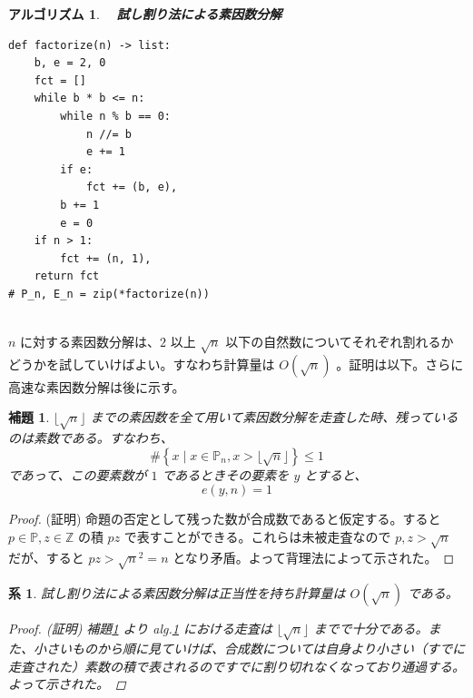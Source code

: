 \documentclass[12pt, a4j]{ltjsarticle}
\newtheorem{lem}[thm]{補題}
\newtheorem{cor}[thm]{系}
\newtheorem{alg}[thm]{アルゴリズム}
\begin{document}
\vspace{1cm}
\begin{alg}\upshape　{\bf 試し割り法による素因数分解} \label{alg:try}
\quad\\
\begin{lstlisting}
def factorize(n) -> list:
    b, e = 2, 0
    fct = []
    while b * b <= n:
        while n % b == 0:
            n //= b
            e += 1
        if e:
            fct += (b, e),
        b += 1
        e = 0
    if n > 1:
        fct += (n, 1),
    return fct
# P_n, E_n = zip(*factorize(n))
\end{lstlisting}
\end{alg}
\\
$n$ に対する素因数分解は、$2$ 以上 $\sqrt{n}$ 以下の自然数についてそれぞれ割れるかどうかを試していけばよい。すなわち計算量は $O\left(\sqrt{n}\right)$ 。証明は以下。さらに高速な素因数分解は後に示す。
\vspace{1cm}
\begin{lem}\label{extsos}
$\lfloor \sqrt{n} \rfloor$ までの素因数を全て用いて素因数分解を走査した時、残っているのは素数である。すなわち、
\begin{equation}
\#\left\{x \mid x\in \mathbb{P}_n, x>\lfloor \sqrt{n} \rfloor\right\} \le 1
\end{equation}
であって、この要素数が $1$ であるときその要素を $y$ とすると、
\begin{equation}
e(y,n) = 1
\end{equation}
\end{lem}
\begin{proof}
(証明) 命題の否定として残った数が合成数であると仮定する。すると $p \in \mathbb{P}, z \in \mathbb{Z}$ の積 $pz$ で表すことができる。これらは未被走査なので $p, z > \sqrt{n}$ だが、すると $pz > \sqrt{n}^2 = n$ となり矛盾。よって背理法によって示された。
\end{proof}

\begin{cor} 試し割り法による素因数分解は正当性を持ち計算量は $O(\sqrt{n})$ である。
\begin{proof}(証明)
補題\ref{extsos} より alg.\ref{alg:try} における走査は $\lfloor \sqrt{n} \rfloor$ までで十分である。また、小さいものから順に見ていけば、合成数については自身より小さい（すでに走査された）素数の積で表されるのですでに割り切れなくなっており通過する。よって示された。
\end{proof}
\end{cor}
\vspace{1cm}
\end{document}
